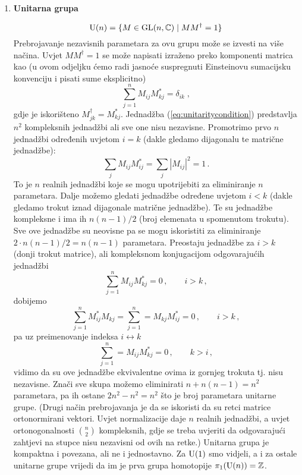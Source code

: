 \begin{enumerate}[leftmargin=0pt, itemindent=0pt]
\item \textbf{Unitarna grupa}

\begin{equation}
\mathrm{U}(n) = \{ M\in \mathrm{GL}(n,\mathbb{C}) \; | \; M M^{\dagger} = 1\}
\end{equation}
Prebrojavanje nezavisnih parametara za ovu grupu može se izvesti
na više načina. Uvjet $M M^\dagger = 1$ se može napisati izraženo
preko komponenti matrica kao (u ovom odjeljku ćemo radi jasnoće
suspregnuti Einsteinovu sumacijsku konvenciju i pisati sume eksplicitno)
\begin{equation}
\sum_{j=1}^{n} M_{ij} M_{kj}^* = \delta_{ik}\;,
\label{eq:unitaritycondition}
\end{equation}
gdje je iskorišteno $M^{\dagger}_{jk} = M^{*}_{kj}$.
Jednadžba (\ref{eq:unitaritycondition}) predstavlja $n^2$ kompleksnih
jednadžbi ali sve one nisu nezavisne. Promotrimo prvo $n$ jednadžbi
određenih uvjetom $i=k$ (dakle gledamo dijagonalu te matrične jednadžbe):
\begin{equation}
 \sum_j M_{ij} M^{*}_{ij} = \sum_j |M_{ij}|^2 = 1 \,.
\label{eq:diagonalcondition}
\end{equation}
To je $n$ realnih jednadžbi koje se mogu upotrijebiti za eliminiranje
$n$ parametara. Dalje možemo gledati jednadžbe određene uvjetom
$i < k$ (dakle gledamo trokut iznad dijagonale matrične jednadžbe).
Te su jednadžbe kompleksne i ima ih $n(n-1)/2$ (broj elemenata u 
spomenutom trokutu). Sve ove jednadžbe su neovisne pa se mogu
iskoristiti za eliminiranje $2 \cdot n(n-1)/2 = n(n-1)$ parametara.
Preostaju jednadžbe za $i >k$ (donji trokut matrice), ali kompleksnom
konjugacijom odgovarajućih jednadžbi
\begin{equation}
\sum_{j=1}^{n} M_{ij} M_{kj}^* = 0\,, \qquad i>k \,,
\end{equation}
dobijemo
\begin{equation}
\sum_{j=1}^{n} M_{ij}^* M_{kj}  = \sum_{j=1}^{n} = M_{kj} M_{ij}^* = 0\,, \qquad i>k \,,
\end{equation}
pa uz preimenovanje indeksa $i \leftrightarrow k$
\begin{equation}
\sum_{j=1}^{n} =  M_{ij} M_{kj}^* = 0\,, \qquad k>i \,,
\end{equation}
vidimo da su ove jednadžbe ekvivalentne ovima iz gornjeg trokuta tj. nisu
nezavisne.
Znači sve skupa možemo eliminirati $n + n(n-1) = n^2$ parametara, pa ih
ostane $2n^2 - n^2 = n^2$ što je broj parametara unitarne grupe.
(Drugi način prebrojavanja je da se iskoristi da su retci matrice ortonormirani
vektori. Uvjet normalizacije daje $n$ realnih jednadžbi, a uvjet
ortonogonalnosti $\binom{n}{2}$ kompleksnih, gdje se treba uvjeriti
da odgovarajući zahtjevi na stupce nisu nezavisni od ovih na retke.)
Unitarna grupa je kompaktna i povezana, ali ne i jednostavno. Za $\mathrm{U}(1)$
smo vidjeli, a i za ostale unitarne grupe
vrijedi da im je prva grupa homotopije $\pi_{1}(\mathrm{U}(n)) = \mathbb{Z}$.


\end{enumerate}
